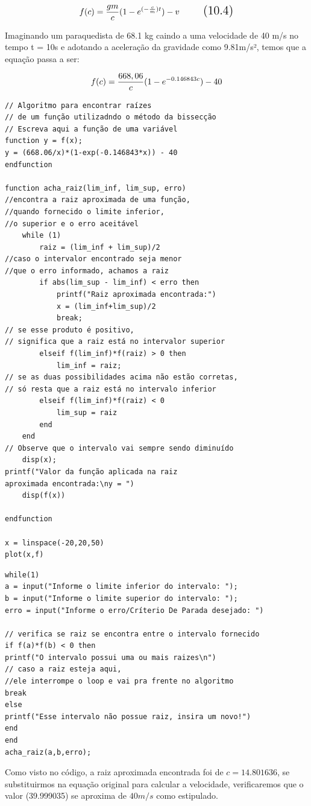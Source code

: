 \begin{equation}
\Large f(c) = \frac{gm}{c}(1-e^{(-\frac{c}{m})t}) - v
\tag{10.4}
\end{equation}

Imaginando um paraquedista de 68.1 kg caindo a uma velocidade de 40 m/s no tempo t = 10s e adotando a aceleração da gravidade como 9.81m/s², temos que a equação passa a ser:

$$\Large f(c) = \frac{668,06}{c}(1 - e^{-0.146843c})-40$$

\begin{verbatim}
// Algoritmo para encontrar raízes 
// de um função utilizadndo o método da bissecção 
// Escreva aqui a função de uma variável 
function y = f(x); 
y = (668.06/x)*(1-exp(-0.146843*x)) - 40 
endfunction

function acha_raiz(lim_inf, lim_sup, erro) 
//encontra a raiz aproximada de uma função, 
//quando fornecido o limite inferior, 
//o superior e o erro aceitável    
	while (1)
		raiz = (lim_inf + lim_sup)/2
//caso o intervalor encontrado seja menor 
//que o erro informado, achamos a raiz
		if abs(lim_sup - lim_inf) < erro then
			printf("Raiz aproximada encontrada:")
			x = (lim_inf+lim_sup)/2
			break;
// se esse produto é positivo, 
// significa que a raiz está no intervalor superior
		elseif f(lim_inf)*f(raiz) > 0 then 
			lim_inf = raiz;
// se as duas possibilidades acima não estão corretas, 
// só resta que a raiz está no intervalo inferior
		elseif f(lim_inf)*f(raiz) < 0  
			lim_sup = raiz                
		end
	end
// Observe que o intervalo vai sempre sendo diminuído
	disp(x);
printf("Valor da função aplicada na raiz 
aproximada encontrada:\ny = ")
	disp(f(x))

endfunction

x = linspace(-20,20,50)
plot(x,f)
\end{verbatim}

\begin{verbatim}
while(1)
a = input("Informe o limite inferior do intervalo: ");
b = input("Informe o limite superior do intervalo: ");
erro = input("Informe o erro/Críterio De Parada desejado: ")

// verifica se raiz se encontra entre o intervalo fornecido
if f(a)*f(b) < 0 then 
printf("O intervalo possui uma ou mais raizes\n")
// caso a raiz esteja aqui, 
//ele interrompe o loop e vai pra frente no algoritmo
break 
else
printf("Esse intervalo não possue raiz, insira um novo!")
end
end
acha_raiz(a,b,erro);
\end{verbatim}

Como visto no código, a raiz aproximada encontrada foi de $c = 14.801636$, se substituirmos na equação original para calcular a velocidade, verificaremos que o valor (39.999035) se aproxima de $40 m/s$ como estipulado.